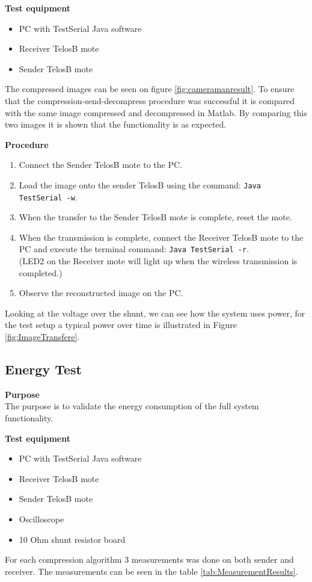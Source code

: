 \textbf{Test equipment}
\begin{itemize}
\item PC with TestSerial Java software
\item Receiver TelosB mote
\item Sender TelosB mote
\end{itemize}
The compressed images can be seen on figure \ref{fig:cameramanresult}. 
To ensure that the compression-send-decompress procedure was successful it is compared with the same image compressed and decompressed in Matlab. 
By comparing this two images it is shown that the functionality is as expected. 

\textbf{Procedure}
\vspace{-15pt}
\begin{enumerate}
\item Connect the Sender TelosB mote to the PC.
\item Load the image onto the sender TelosB using the command: \texttt{Java TestSerial -w}.
\item When the transfer to the Sender TelosB mote is complete, reset the mote. 
\item When the transmission is complete, connect the Receiver TelosB mote to the PC and execute the terminal command: \texttt{Java TestSerial -r}. \\
(LED2 on the Receiver mote will light up when the wireless transmission is completed.)
\item Observe the reconstructed image on the PC.
\end{enumerate}

Looking at the voltage over the shunt, we can see how the system uses power, for the test setup a typical power over time is illustrated in Figure \ref{fig:ImageTransfere}.

\subsection{Energy Test}
\textbf{Purpose} \\
The purpose is to validate the energy consumption of the full system functionality.

\textbf{Test equipment}
\begin{itemize}
\item PC with TestSerial Java software
\item Receiver TelosB mote
\item Sender TelosB mote
\item Oscilloscope
\item 10 Ohm shunt resistor board
\end{itemize}
For each compression algorithm 3 measurements was done on both sender and receiver. The measurements can be seen in the table \ref{tab:MeasurementResults}.

